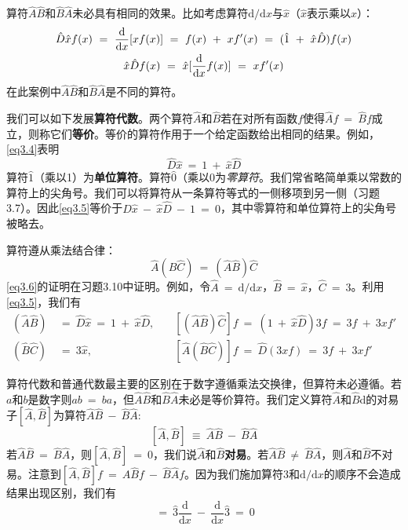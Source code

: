 \documentclass[12pt,a4paper,openany]{ctexbook}
\begin{document}
\begin{flushleft}
算符$\hat{A}\hat{B}$和$\hat{B}\hat{A}$未必具有相同的效果。比如考虑算符$\mathrm{d}/\mathrm{d}x$与$\hat{x}$（$\hat{x}$表示乘以$x$）：
\begin{gather}
    \hat{D}\hat{x}f(x)\ =\ \frac{\mathrm{d}}{\mathrm{d}x}[xf(x)]\ =\ f(x)\ +\ xf'(x)\ =\ (\hat{1}\ +\ \hat{x}\hat{D})f(x) \label{eq3.4} \\
    \hat{x}\hat{D}f(x)\ =\ \hat{x}[\frac{\mathrm{d}}{\mathrm{d}x}f(x)]\ =\ xf'(x) \notag
\end{gather}
在此案例中$\hat{A}\hat{B}$和$\hat{B}\hat{A}$是不同的算符。

我们可以如下发展\textbf{算符代数}。两个算符$\hat{A}$和$\hat{B}$若在对所有函数$f$使得$\hat{A}f\ =\ \hat{B}f$成立，则称它们\textbf{等价}。等价的算符作用于一个给定函数给出相同的结果。例如，\eqref{eq3.4}表明
\begin{equation}
    \hat{D}\hat{x}\ =\ 1\ +\ \hat{x}\hat{D}
    \label{eq3.5}
\end{equation}
算符$\hat{1}$（乘以1）为\textbf{单位算符}。算符$\hat{0}$（乘以0为\textit{零算符}。我们常省略简单乘以常数的算符上的尖角号。我们可以将算符从一条算符等式的一侧移项到另一侧（习题3.7）。因此\eqref{eq3.5}等价于$\hat{D}\hat{x}\ -\ \hat{x}\hat{D}\ -\ 1\ =\ 0$，其中零算符和单位算符上的尖角号被略去。

算符遵从乘法结合律：
\begin{equation}
    \hat{A}(\hat{B}\hat{C})\ =\ (\hat{A}\hat{B})\hat{C}
    \label{eq3.6}
\end{equation}
\eqref{eq3.6}的证明在习题3.10中证明。例如，令$\hat{A}\ =\ \mathrm{d}/\mathrm{d}x$，$\hat{B}\ =\ \hat{x}$，$\hat{C}\ =\ 3$。利用\eqref{eq3.5}，我们有
\begin{align*}
    (\hat{A}\hat{B})\ &=\ \hat{D}\hat{x}\ =\ 1\ +\ \hat{x}\hat{D},\quad&[(\hat{A}\hat{B})\hat{C}]f\ =\ (1\ +\ \hat{x}\hat{D})3f\ =\ 3f\ +\ 3xf' \\
    (\hat{B}\hat{C})\ &=\ 3\hat{x},\quad&[\hat{A}(\hat{B}\hat{C})]f\ =\ \hat{D}(3xf)\ =\ 3f\ +\ 3xf'
\end{align*}

算符代数和普通代数最主要的区别在于数字遵循乘法交换律，但算符未必遵循。若$a$和$b$是数字则$ab\ =\ ba$，但$\hat{A}\hat{B}$和$\hat{B}\hat{A}$未必是等价算符。我们定义算符$\hat{A}$和$\hat{B}$d的对易子$[\hat{A},\hat{B}]$为算符$\hat{A}\hat{B}\ -\ \hat{B}\hat{A}$:
\begin{equation}
    \boxed{[\hat{A},\hat{B}]\ \equiv\ \hat{A}\hat{B}\ -\ \hat{B}\hat{A}}
    \label{eq3.7}
\end{equation}
若$\hat{A}\hat{B}\ =\ \hat{B}\hat{A}$，则$[\hat{A},\hat{B}]\ =\ 0$，我们说$\hat{A}$和$\hat{B}$\textbf{对易}。若$\hat{A}\hat{B}\ \neq\ \hat{B}\hat{A}$，则$\hat{A}$和$\hat{B}$不对易。注意到$[\hat{A},\hat{B}]f\ =\ \hat{A}\hat{B}f\ -\ \hat{B}\hat{A}f$。因为我们施加算符3和$\mathrm{d}/\mathrm{d}x$的顺序不会造成结果出现区别，我们有
\begin{equation*}
    [\hat{3},\frac{\mathrm{d}}{\mathrm{d}x}]\ =\ \hat{3}\frac{\mathrm{d}}{\mathrm{d}x}\ -\ \frac{\mathrm{d}}{\mathrm{d}x}\hat{3}\ =\ 0
\end{equation*}


\end{flushleft}
\end{document}
